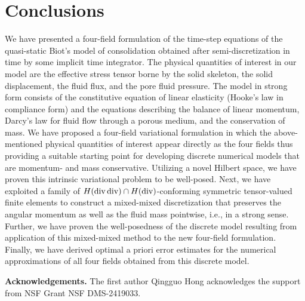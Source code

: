\documentclass[11pt]{amsart}
\theoremstyle{remark}
\theoremstyle{definition}
\begin{document}
\section{Conclusions}\label{sec:num_res} 

We have presented a four-field formulation of the time-step equations of the quasi-static Biot's model of consolidation obtained after semi-discretization in time by some implicit time integrator. The physical quantities of interest in our model are the effective stress tensor borne by the solid skeleton, the solid displacement, the fluid flux, and the pore fluid pressure. The model in strong form consists of the constitutive equation of linear elasticity (Hooke's law in compliance form) and the equations describing the balance of linear momentum, Darcy's law for fluid flow through a porous medium, and the conservation of mass. We have proposed a four-field variational formulation in which the above-mentioned physical quantities of interest appear directly as the four fields thus providing a suitable starting point for developing discrete numerical models that are momentum- and mass conservative. Utilizing a novel Hilbert space, we have proven this intrinsic variational problem to be well-posed. Next, we have exploited a family of  $H({\rm div} \, {\rm div}) \cap H({\rm div})$-conforming symmetric tensor-valued finite elements to construct a mixed-mixed discretization that preserves the angular momentum as well as the fluid mass pointwise, i.e., in a strong sense. Further, we have proven the well-posedness of the discrete model resulting from application of this mixed-mixed method to the new four-field formulation. Finally, we have derived optimal a priori error estimates for the numerical approximations of all four fields obtained from this discrete model.

\textbf{Acknowledgements.} The first author Qingguo Hong acknowledges the support from NSF Grant NSF DMS-2419033. 
\end{document}
